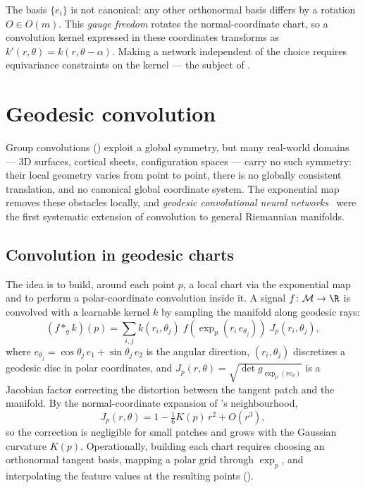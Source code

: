 \begin{remark}
\label{rem:geo:gauge}
The basis $\{e_i\}$ is not canonical: any other orthonormal basis differs by a
rotation $O \in O(m)$. This \emph{gauge freedom} rotates the normal-coordinate
chart, so a convolution kernel expressed in these coordinates transforms as
$k'(r,\theta) = k(r, \theta - \alpha)$. Making a network independent of the
choice requires equivariance constraints on the kernel --- the subject of
.
\end{remark}

\section{Geodesic convolution}
\label{sec:geo:convolution}

Group convolutions () exploit a global symmetry, but many
real-world domains --- 3D surfaces, cortical sheets, configuration spaces ---
carry no such symmetry: their local geometry varies from point to point, there
is no globally consistent translation, and no canonical global coordinate
system. The exponential map removes these obstacles locally, and \emph{geodesic
convolutional neural networks}~\citep{masci2015geodesic} were the first
systematic extension of convolution to general Riemannian manifolds.

\subsection{Convolution in geodesic charts}
\label{subsec:geo:gcnn}

The idea is to build, around each point $p$, a local chart via the exponential
map and to perform a polar-coordinate convolution inside it. A signal
$f \colon \M \to \R$ is convolved with a learnable kernel $k$ by sampling the
manifold along geodesic rays:
\begin{equation}
\label{eq:geo:gcnn}
  (f *_g k)(p) = \sum_{i,j} k(r_i, \theta_j)\;
    f\!\left(\exp_p(r_i\, e_{\theta_j})\right)\; J_p(r_i, \theta_j),
\end{equation}
where $e_{\theta_j} = \cos\theta_j\, e_1 + \sin\theta_j\, e_2$ is the angular
direction, $(r_i, \theta_j)$ discretizes a geodesic disc in polar coordinates,
and $J_p(r, \theta) = \sqrt{\det g_{\exp_p(r e_\theta)}}$ is a Jacobian factor
correcting the distortion between the tangent patch and the manifold. By the
normal-coordinate expansion of 's neighbourhood,
\[
  J_p(r, \theta) = 1 - \tfrac{1}{6} K(p)\, r^2 + O(r^3),
\]
so the correction is negligible for small patches and grows with the Gaussian
curvature $K(p)$. Operationally, building each chart requires choosing an
orthonormal tangent basis, mapping a polar grid through $\exp_p$, and
interpolating the feature values at the resulting points
().

